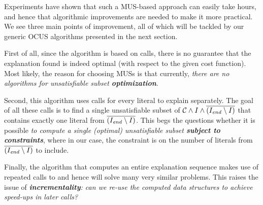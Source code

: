 Experiments have shown that such a MUS-based approach can easily take hours, and hence that algorithmic improvements are needed to make it more practical. 
We see three main points of improvement, all of which will be tackled by our generic OCUS algorithms presented in the next section. 
\begin{inparaenum}
 \item First of all, since the algorithm is based on  calls, there is no guarantee that the explanation found is indeed optimal %
 (with respect to the given cost function). 
 Most likely, the reason for choosing MUSs is that currently, \textit{there are no algorithms for unsatisfiable subset \textbf{optimization}}. 
 \item Second, this algorithm uses  calls for every literal to explain separately. The goal of all these calls is to find a single unsatisfiable subset of $\mathcal{C}  \land I \land \overline{(I_\mathit{end} \setminus I)}$ that contains exactly one literal from $\overline{(I_\mathit{end} \setminus I)}$. This begs the questions whether it is possible \textit{to compute a single (optimal) unsatisfiable subset \textbf{subject to constraints}}, where in our case, the constraint is on the number of literals from $\overline{(I_\mathit{end} \setminus I)}$ to include. 
 \item Finally, the algorithm that computes an entire explanation sequence makes use of repeated calls to \onestep and hence will solve many very similar problems. This raises the issue of \textit{\textbf{incrementality}: can we re-use the computed data structures to achieve speed-ups in later calls?}
\end{inparaenum}




